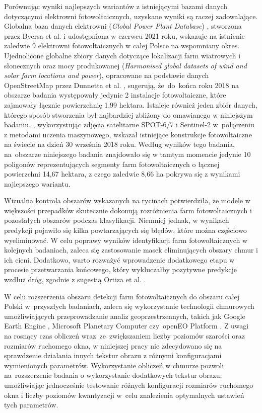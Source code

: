 \documentclass{amuthesis}
\begin{document}
Porównując wyniki najlepszych wariantów z istniejącymi bazami danych
dotyczącymi elektrowni fotowoltaicznych, uzyskane wyniki są raczej
zadowalające. Globalna baza danych elektrowni (\emph{Global Power Plant
Database}) \autocite{globalpowerplantdb_2021}, stworzona przez Byersa et
al. \autocite*{byers_2018_globalpowerplantdb} i udostępniona w czerwcu
2021 roku, wskazuje na istnienie zaledwie 9 elektrowni fotowoltaicznych
w całej Polsce na wspomniany okres. Ujednolicone globalne zbiory danych
dotyczące lokalizacji farm wiatrowych i słonecznych oraz mocy
produkowanej (\emph{Harmonised global datasets of wind and solar farm
locations and power}), opracowane na podstawie danych OpenStreetMap
przez Dunnetta et al. \autocite*{dunnet_2020_wind_solar}, sugerują,
że~do~końca roku 2018 na obszarze badania występowały jedynie 2
instalacje fotowoltaiczne, które zajmowały łącznie powierzchnię 1,99
hektara. Istnieje również jeden zbiór danych, którego sposób stworzenia
był najbardziej zbliżony do omawianego w niniejszym badaniu.
\textcite{kruitwagen_2021_pv}, wykorzystując zdjęcia satelitarne
SPOT-6/7 i Sentinel-2 w~połączeniu z metodami uczenia maszynowego,
wskazał istniejące konstrukcje fotowoltaiczne na świecie na dzień 30
września 2018 roku. Według wyników tego badania, na~obszarze niniejszego
badania znajdowało się w tamtym momencie jedynie 10 poligonów
reprezentujących segmenty farm fotowoltaicznych o łącznej powierzchni
14,67 hektara, z czego zaledwie 8,66 ha pokrywa się z wynikami
najlepszego wariantu.

Wizualna kontrola obszarów wskazanych na rycinach potwierdziła, że
modele w większości przepadków skutecznie dokonują rozróżnienia farm
fotowoltaicznych i pozostałych obszarów podczas klasyfikacji. Niemniej
jednak, w wynikach predykcji pojawiło się kilka powtarzających się
błędów, które można częściowo wyeliminować. W celu poprawy wyników
identyfikacji farm fotowoltaicznych w kolejnych badaniach, zaleca się
zastosowanie masek eliminujących obszary chmur i ich cieni. Dodatkowo,
warto rozważyć wprowadzenie dodatkowego etapu w procesie przetwarzania
końcowego, który wykluczałby pozytywne predykcje wzdłuż dróg, zgodnie z
sugestią Ortiza et al. \autocite*{ortiz_2022_pv}.

W celu rozszerzenia obszaru detekcji farm fotowoltaicznych do obszaru
całej Polski w~przyszłych badaniach, zaleca się wykorzystanie
technologii chmurowych umożliwiających przeprowadzanie analiz
geoprzestrzennych, takich jak Google Earth Engine
\autocite{gorelick_2017_gee}, Microsoft Planetary Computer
\autocite{microsoft_planetary_computer} czy~openEO Platform
\autocite{openEO_platform}. Z uwagi na rosnący czas obliczeń
wraz~ze~zwiększaniem liczby poziomów szarości oraz rozmiarów ruchomego
okna, w niniejszej pracy nie zdecydowano się na sprawdzenie działania
innych tekstur obrazu z różnymi konfiguracjami wymienionych parametrów.
Wykorzystanie obliczeń w chmurze pozwoli na~rozszerzenie badania o
wykorzystanie dodatkowych tekstur obrazu, umożliwiając jednocześnie
testowanie różnych konfiguracji rozmiarów ruchomego okna i liczby
poziomów kwantyzacji w~celu znalezienia optymalnych ustawień tych
parametrów.

\printbibliography[heading=bibintoc, title=Bibliografia]
\end{document}
